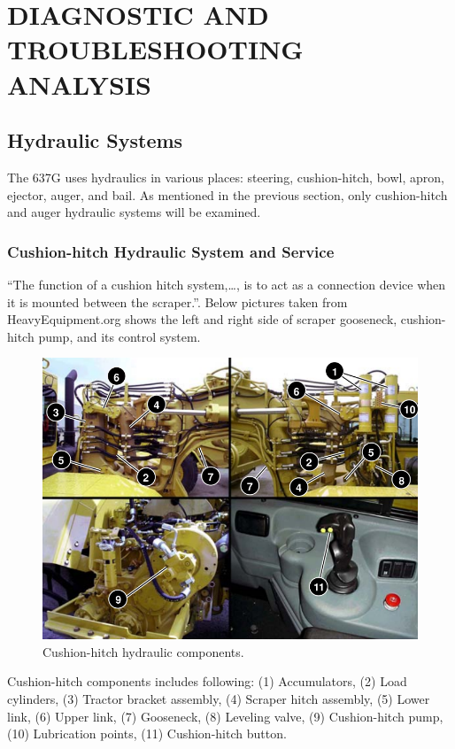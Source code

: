 \documentclass[a4paper,man,natbib]{apa6}
\begin{document}
\section{DIAGNOSTIC AND TROUBLESHOOTING ANALYSIS}

\subsection{Hydraulic Systems}

The 637G uses hydraulics in various places: steering, cushion-hitch, bowl, apron, ejector, auger, and bail. As mentioned in the previous section, only cushion-hitch and auger hydraulic systems will be examined.

\subsubsection{Cushion-hitch Hydraulic System and Service}

``The function of a cushion hitch system,\ldots, is to act as a connection device when it is mounted between the scraper.''\citep{GOASspns}. Below pictures taken from HeavyEquipment.org shows the left and right side of scraper gooseneck, cushion-hitch pump, and its control system. 

\begin{figure}[!ht]
\centering
\includegraphics[width=\textwidth]{cushion-hitch-comp-location.png}
\centering\caption{\label{fig:cshh}Cushion-hitch hydraulic components. \citep{GOASspns}}
\end{figure}
\FloatBarrier{}

Cushion-hitch components includes following: (1) Accumulators, (2) Load cylinders, (3) Tractor bracket assembly, (4) Scraper hitch assembly, (5) Lower link, (6) Upper link, (7) Gooseneck, (8) Leveling valve, (9) Cushion-hitch pump, (10) Lubrication points, (11) Cushion-hitch button.
\end{document}
